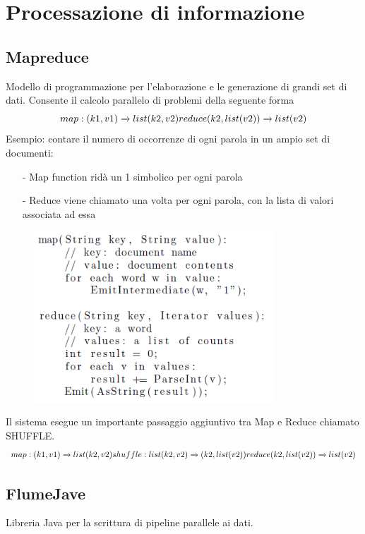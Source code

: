 \documentclass[12pt,italian]{report}
\begin{document}
\section{Processazione di informazione}
\subsection{Mapreduce}
Modello di programmazione per l'elaborazione e le generazione di grandi set di dati. Consente il calcolo parallelo di problemi della seguente forma 
\begin{equation}
    map: (k1,v1) \xrightarrow{} list(k2, v2) \\
    reduce (k2, list(v2)) \xrightarrow{} list(v2)
\end{equation}
Esempio: contare il numero di occorrenze di ogni parola in un ampio set di documenti: 
\begin{itemize}
    \item [-] Map function ridà un 1 simbolico per ogni parola
    \item [-] Reduce viene chiamato una volta per ogni parola, con la lista di valori associata ad essa
\end{itemize}

\begin{figure}[h]
\centering
\includegraphics[width=90mm]{img/mapreduce.PNG}
\end{figure}
Il sistema esegue un importante passaggio aggiuntivo tra Map e Reduce chiamato SHUFFLE.
\begin{equation}
    map: (k1,v1) \xrightarrow{} list(k2, v2) \\
    shuffle: list(k2, v2) \xrightarrow{} (k2, list(v2)) \\
    reduce (k2, list(v2)) \xrightarrow{} list(v2)
\end{equation}

\subsection{FlumeJave}
Libreria Java per la scrittura di pipeline parallele ai dati. 
\end{document}
